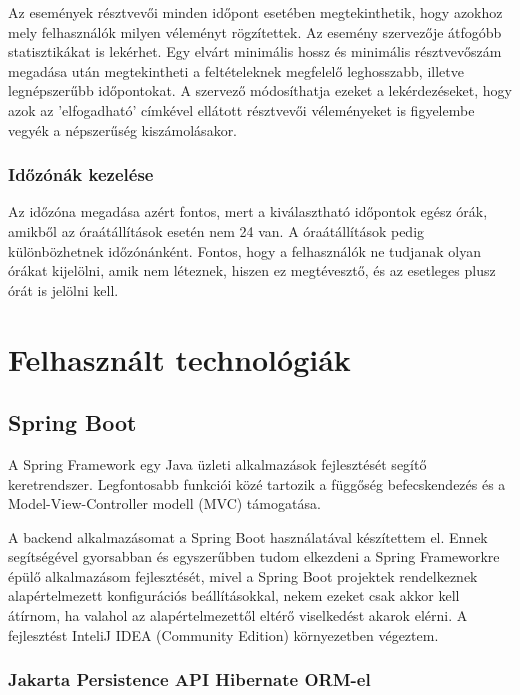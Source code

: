 \documentclass[a4paper,12pt]{report}
\theoremstyle{definition}
\theoremstyle{remark}
\begin{document}
Az események résztvevői minden időpont esetében megtekinthetik, hogy azokhoz mely felhasználók milyen véleményt rögzítettek. Az esemény szervezője átfogóbb statisztikákat is lekérhet. Egy elvárt minimális hossz és minimális résztvevőszám megadása után megtekintheti a feltételeknek megfelelő leghosszabb, illetve legnépszerűbb időpontokat. A szervező módosíthatja ezeket a lekérdezéseket, hogy azok az 'elfogadható' címkével ellátott résztvevői véleményeket is figyelembe vegyék a népszerűség kiszámolásakor.

	\subsection{Időzónák kezelése}

Az időzóna megadása azért fontos, mert a  kiválasztható időpontok egész órák, amikből az óraátállítások esetén nem 24 van. A óraátállítások pedig különbözhetnek időzónánként. Fontos, hogy a felhasználók ne tudjanak olyan órákat kijelölni, amik nem léteznek, hiszen ez megtévesztő, és az esetleges plusz órát is jelölni kell.

\chapter{Felhasznált technológiák}

\section{Spring Boot}

A Spring Framework egy Java üzleti alkalmazások fejlesztését segítő keretrendszer. Legfontosabb funkciói közé tartozik a függőség befecskendezés és a Model-View-Controller modell (MVC) támogatása.

A backend alkalmazásomat a Spring Boot\cite{Springwebsite} használatával készítettem el. Ennek segítségével gyorsabban és egyszerűbben tudom elkezdeni a Spring Frameworkre épülő alkalmazásom fejlesztését, mivel a Spring Boot projektek rendelkeznek alapértelmezett konfigurációs beállításokkal, nekem ezeket csak akkor kell átírnom, ha valahol az alapértelmezettől eltérő viselkedést akarok elérni. A fejlesztést InteliJ IDEA (Community Edition)\cite{IDEAwebsite} környezetben végeztem.

	\subsection{Jakarta Persistence API Hibernate ORM-el}
\end{document}
